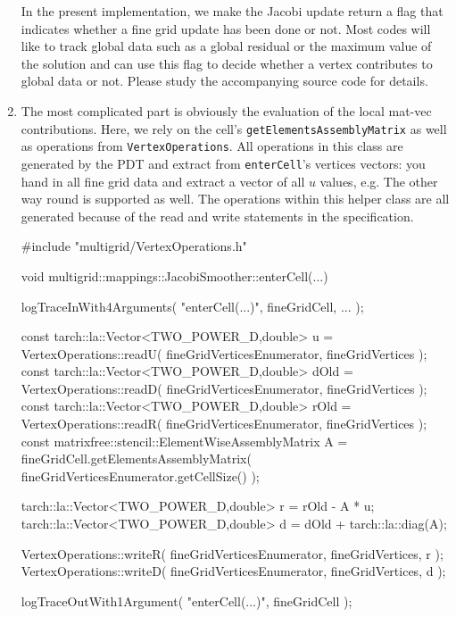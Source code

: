 \begin{enumerate}
    In the present implementation, we make the Jacobi update return a flag that
    indicates whether a fine grid update has been done or not. 
    Most codes will like to track global data such as a global residual or the
    maximum value of the solution and can use this flag to decide whether a
    vertex contributes to global data or not. Please study the accompanying
    source code for details.
    
    \item The most complicated part is obviously the evaluation of the local
    mat-vec contributions. Here, we rely on the cell's
    \texttt{getElementsAssemblyMatrix} as well as operations from \newline
    \texttt{VertexOperations}. All operations in this class are generated by the
    PDT and extract from \texttt{enterCell}'s vertices vectors: you hand in all
    fine grid data and extract a vector of all $u$ values, e.g. The other way
    round is supported as well. The operations within this helper class are all
    generated because of the read and write statements in the specification. 
    \begin{code}
#include "multigrid/VertexOperations.h"

void multigrid::mappings::JacobiSmoother::enterCell(...) {
  logTraceInWith4Arguments( "enterCell(...)", fineGridCell, ... );

  const tarch::la::Vector<TWO_POWER_D,double> u    =
    VertexOperations::readU( fineGridVerticesEnumerator, fineGridVertices );
  const tarch::la::Vector<TWO_POWER_D,double> dOld    =
    VertexOperations::readD( fineGridVerticesEnumerator, fineGridVertices );
  const tarch::la::Vector<TWO_POWER_D,double> rOld =
    VertexOperations::readR( fineGridVerticesEnumerator, fineGridVertices );
  const matrixfree::stencil::ElementWiseAssemblyMatrix A =
    fineGridCell.getElementsAssemblyMatrix( fineGridVerticesEnumerator.getCellSize() );

  tarch::la::Vector<TWO_POWER_D,double> r = rOld - A * u;
  tarch::la::Vector<TWO_POWER_D,double> d = dOld + tarch::la::diag(A);

  VertexOperations::writeR( fineGridVerticesEnumerator, fineGridVertices, r );
  VertexOperations::writeD( fineGridVerticesEnumerator, fineGridVertices, d );

  logTraceOutWith1Argument( "enterCell(...)", fineGridCell );
}
    \end{code}
\end{enumerate}



